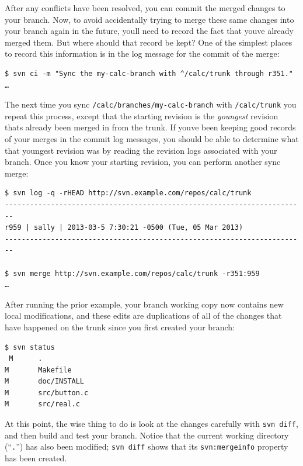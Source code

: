 After any conflicts have been resolved, you can commit the merged
changes to your branch. Now, to avoid accidentally trying to merge these
same changes into your branch again in the future,
you\textquotesingle ll need to record the fact that
you\textquotesingle ve already merged them. But where should that record
be kept? One of the simplest places to record this information is in the
log message for the commit of the merge:

\begin{verbatim}
$ svn ci -m "Sync the my-calc-branch with ^/calc/trunk through r351."
…
\end{verbatim}

The next time you sync \texttt{/calc/branches/my-calc-branch} with
\texttt{/calc/trunk} you repeat this process, except that the starting
revision is the \emph{youngest} revision that\textquotesingle s already
been merged in from the trunk. If you\textquotesingle ve been keeping
good records of your merges in the commit log messages, you should be
able to determine what that youngest revision was by reading the
revision logs associated with your branch. Once you know your starting
revision, you can perform another sync merge:

\begin{verbatim}
$ svn log -q -rHEAD http://svn.example.com/repos/calc/trunk
------------------------------------------------------------------------
r959 | sally | 2013-03-5 7:30:21 -0500 (Tue, 05 Mar 2013)
------------------------------------------------------------------------

$ svn merge http://svn.example.com/repos/calc/trunk -r351:959
…
\end{verbatim}

After running the prior example, your branch working copy now contains
new local modifications, and these edits are duplications of all of the
changes that have happened on the trunk since you first created your
branch:

\begin{verbatim}
$ svn status
 M      .
M       Makefile
M       doc/INSTALL
M       src/button.c
M       src/real.c
\end{verbatim}

At this point, the wise thing to do is look at the changes carefully
with \texttt{svn\ diff}, and then build and test your branch. Notice
that the current working directory (``\texttt{.}'') has also been
modified; \texttt{svn\ diff} shows that its \texttt{svn:mergeinfo}
property has been created.

